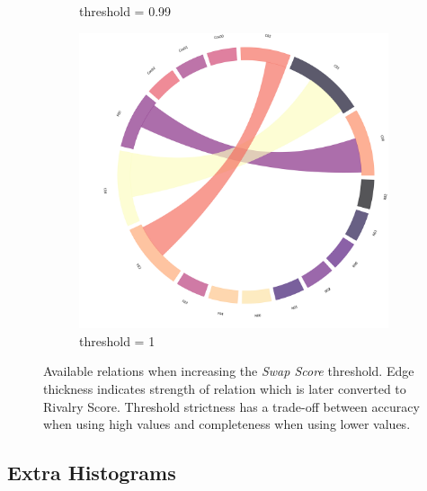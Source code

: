 \begin{figure}[!ht]
\begin{subfigure}[b]{0.3\linewidth}
		\caption{threshold = 0.99}
	\end{subfigure}
	\hfill
	\begin{subfigure}[b]{0.3\linewidth}
		\includegraphics[width=\linewidth]{figures/chords/chord_swap_Ensemble1000_RCN53333001.png}
		\caption{threshold = 1}
	\end{subfigure}
	\caption{Available relations when increasing the \emph{Swap Score} threshold. Edge thickness indicates strength of relation which is later converted to Rivalry Score. Threshold strictness has a trade-off between accuracy when using high values and completeness when using lower values.}
	\label{fig:six-chords}
\end{figure}
\FloatBarrier

\newpage
\subsection{Extra Histograms}
\label{section:suppl:extra-hist}


